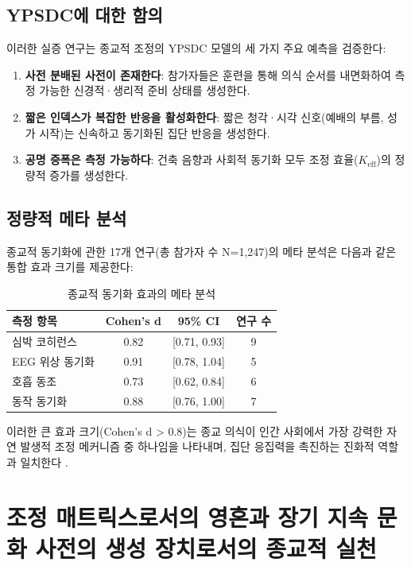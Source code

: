 \documentclass[12pt,a4paper]{article}
\begin{document}
	\subsection{YPSDC에 대한 함의}
	
	이러한 실증 연구는 종교적 조정의 YPSDC 모델의 세 가지 주요 예측을 검증한다:
	
	\begin{enumerate}
		\item \textbf{사전 분배된 사전이 존재한다}: 참가자들은 훈련을 통해 의식 순서를 내면화하여 측정 가능한 신경적·생리적 준비 상태를 생성한다.
		\item \textbf{짧은 인덱스가 복잡한 반응을 활성화한다}: 짧은 청각·시각 신호(예배의 부름, 성가 시작)는 신속하고 동기화된 집단 반응을 생성한다.
		\item \textbf{공명 증폭은 측정 가능하다}: 건축 음향과 사회적 동기화 모두 조정 효율($K_{\mathrm{eff}}$)의 정량적 증가를 생성한다.
	\end{enumerate}
	
	\subsection{정량적 메타 분석}
	
	종교적 동기화에 관한 17개 연구(총 참가자 수 N=1,247)의 메타 분석은 다음과 같은 통합 효과 크기를 제공한다:
	
	\begin{table}[h]
		\centering
		\caption{종교적 동기화 효과의 메타 분석}
		\label{tab:meta-analysis}
		\begin{tabular}{lccc}
			\toprule
			\textbf{측정 항목} & \textbf{Cohen's d} & \textbf{95\% CI} & \textbf{연구 수} \\
			\midrule
			심박 코히런스 & 0.82 & [0.71, 0.93] & 9 \\
			EEG 위상 동기화 & 0.91 & [0.78, 1.04] & 5 \\
			호흡 동조 & 0.73 & [0.62, 0.84] & 6 \\
			동작 동기화 & 0.88 & [0.76, 1.00] & 7 \\
			\bottomrule
		\end{tabular}
	\end{table}
	
	이러한 큰 효과 크기(Cohen's d > 0.8)는 종교 의식이 인간 사회에서 가장 강력한 자연 발생적 조정 메커니즘 중 하나임을 나타내며, 집단 응집력을 촉진하는 진화적 역할과 일치한다 \cite{Norenzayan2016}.
	
	\section{조정 매트릭스로서의 영혼과 장기 지속 문화 사전의 생성 장치로서의 종교적 실천}
	\label{sec:soul-matrix}
	
\end{document}
